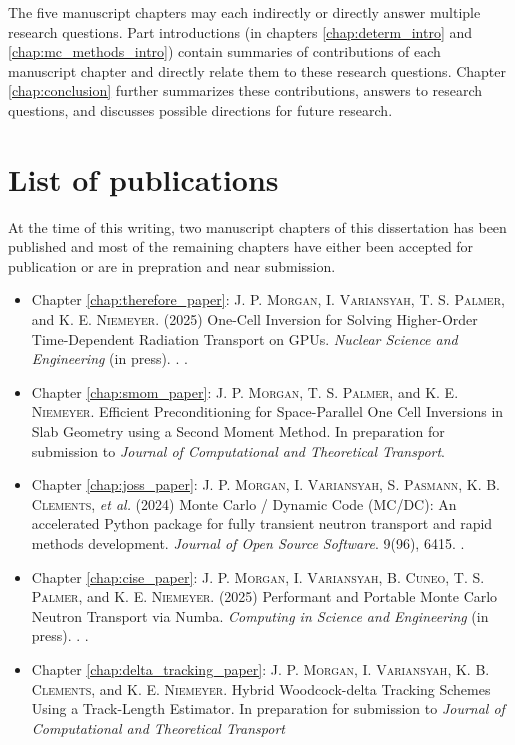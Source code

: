 The five manuscript chapters may each indirectly or directly answer multiple research questions.
Part introductions (in chapters \ref{chap:determ_intro} and \ref{chap:mc_methods_intro}) contain summaries of contributions of each manuscript chapter and directly relate them to these research questions.
Chapter \ref{chap:conclusion} further summarizes these contributions, answers to research questions, and discusses possible directions for future research.

\section{List of publications}

At the time of this writing, two manuscript chapters of this dissertation has been published and most of the remaining chapters have either been accepted for publication or are in prepration and near submission.
\begin{itemize}
    \item Chapter \ref{chap:therefore_paper}: \textsc{J. P. Morgan}, \textsc{I. Variansyah}, \textsc{T. S. Palmer}, and \textsc{K. E. Niemeyer}. (2025) One-Cell Inversion for Solving Higher-Order Time-Dependent Radiation Transport on GPUs. \emph{Nuclear Science and Engineering} (in press). . .

    \item Chapter \ref{chap:smom_paper}: \textsc{J. P. Morgan},  \textsc{T. S. Palmer}, and \textsc{K. E. Niemeyer}. Efficient Preconditioning for Space-Parallel One Cell Inversions in Slab Geometry using a Second Moment Method. In preparation for submission to \emph{Journal of Computational and Theoretical Transport}.

    \item Chapter \ref{chap:joss_paper}: \textsc{J. P. Morgan}, \textsc{I. Variansyah}, \textsc{S. Pasmann}, \textsc{K. B. Clements}, \textit{et al.} (2024) Monte Carlo / Dynamic Code (MC/DC): An accelerated Python package for fully transient neutron transport and rapid methods development. \emph{Journal of Open Source Software}. 9(96), 6415. .

    \item Chapter \ref{chap:cise_paper}: \textsc{J. P. Morgan}, \textsc{I. Variansyah}, \textsc{B. Cuneo}, \textsc{T. S. Palmer}, and \textsc{K. E. Niemeyer}. (2025) Performant and Portable Monte Carlo Neutron Transport via Numba. \emph{Computing in Science and Engineering} (in press). . .

    \item Chapter \ref{chap:delta_tracking_paper}: \textsc{J. P. Morgan}, \textsc{I. Variansyah}, \textsc{K. B. Clements}, and \textsc{K. E. Niemeyer}. Hybrid Woodcock-delta Tracking Schemes Using a Track-Length Estimator. In preparation for submission to \emph{Journal of Computational and Theoretical Transport}
    
\end{itemize}

